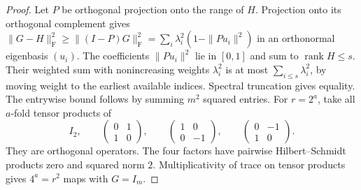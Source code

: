 \documentclass[11pt,reqno]{amsart}
\theoremstyle{definition}
\theoremstyle{remark}
\numberwithin{equation}{section}
\begin{document}
\begin{proof}
Let \(P\) be orthogonal projection onto the range of \(H\).
Projection onto its orthogonal complement gives
\(\|G-H\|_{\mathrm F}^2\ge\|(I-P)G\|_{\mathrm F}^2
=\sum_i\lambda_i^2(1-\|Pu_i\|^2)\) in an orthonormal eigenbasis
\((u_i)\). The coefficients \(\|Pu_i\|^2\) lie in \([0,1]\) and sum to
\(\operatorname{rank}H\le s\). Their weighted sum with nonincreasing
weights \(\lambda_i^2\) is at most \(\sum_{i\le s}\lambda_i^2\), by moving
weight to the earliest available indices. Spectral truncation gives
equality. The entrywise bound follows by summing \(m^2\) squared entries.
For \(r=2^a\), take all \(a\)-fold tensor products of
\[
 I_2,\qquad
 \begin{pmatrix}0&1\\1&0\end{pmatrix},\qquad
 \begin{pmatrix}1&0\\0&-1\end{pmatrix},\qquad
 \begin{pmatrix}0&-1\\1&0\end{pmatrix}.
\]
They are orthogonal operators. The four factors have pairwise
Hilbert--Schmidt products zero and squared norm \(2\). Multiplicativity
of trace on tensor products gives \(4^a=r^2\) maps with \(G=I_m\).
\end{proof}
\end{document}
